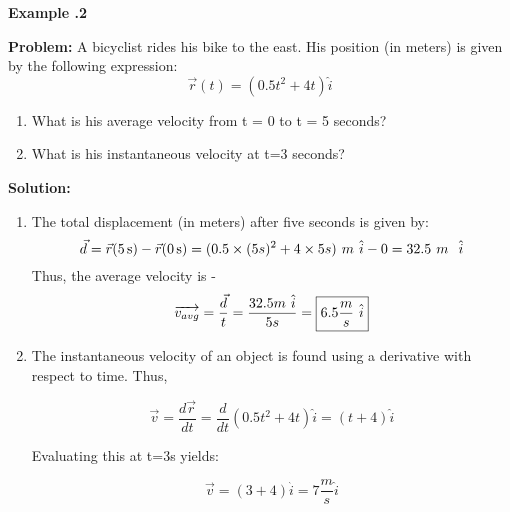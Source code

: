 \begin{mdframed}[backgroundcolor=blue!10!white]
	\begin{center}
		
		
		\textbf{Example \thesection.2}	
	\end{center}
	
	\textbf{Problem: }A bicyclist rides his bike to the east.  His position (in meters) is given by the following expression:
	\begin{equation*}
	\vec{r}(t) = (0.5 t^2 + 4t) \hat{i}
	\end{equation*}
	\begin{enumerate}[label=\alph*.]
		\item What is his average velocity from t = 0 to t = 5 seconds?
		\item What is his instantaneous velocity at t=3 seconds?
	\end{enumerate}
	\vspace{0.1in}
	\textbf{Solution:} \begin{enumerate}[label=\alph*.]
		\item The total displacement (in meters) after five seconds is given by: 
		\begin{equation*}
		\vec{d} = \vec{r}(\SI{5}{s})-\vec{r}(\SI{0}{s}) = (0.5 \times (5s)^2+4\times 5s) \hspace{0.05in} m \hspace{0.05in} \hat{i} - 0 = 32.5 \hspace{0.05in} m \hspace{0.05in} \hspace{0.05in} \hat{i}
		\end{equation*}
		Thus, the average velocity is - 
	\begin{equation*}
	\overrightarrow{v_{avg}}  = \frac{\vec{d}}{t} = \frac{32.5 m \hspace{0.05in} \hat{i}}{5s}  = \boxed{6.5 \frac{m}{s} \hspace{0.05in} \hat{i}}
	\end{equation*}
	
	
	
	\item The instantaneous velocity of an object is found using a derivative with respect to time.  Thus,
	
	\begin{equation*}
	\vec{v} = \frac{d\vec{r}}{dt} = \frac{d}{dt} (0.5 t^2 + 4t) \hat{i} = (t + 4) \hat{i} 
	\end{equation*}
	
	Evaluating this at t=3s yields:
	
	\begin{equation*}
	\vec{v} = (3 + 4) \hat{i} = 7 \frac{m}{s} \hat{i}
	\end{equation*}
	\end{enumerate}
	
\end{mdframed}

